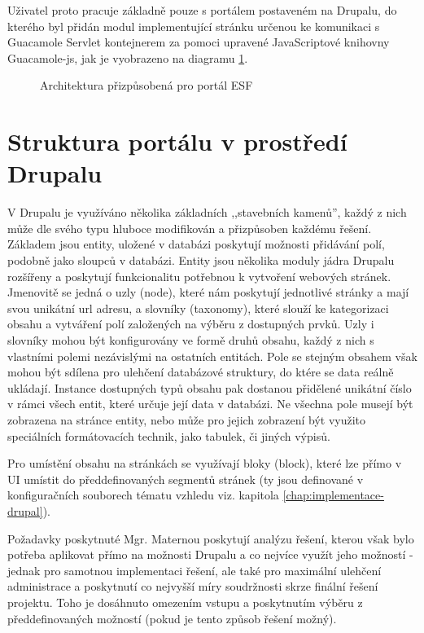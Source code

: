 Uživatel proto pracuje základně pouze s portálem postaveném na Drupalu, do kterého byl přidán modul implementující stránku určenou ke komunikaci s Guacamole Servlet kontejnerem za pomoci upravené JavaScriptové knihovny Guacamole-js, jak je vyobrazeno na diagramu \ref{fig:arch_drupal}.

\begin{figure}[htp] 
  \caption{Architektura přizpůsobená pro portál ESF}
  \label{fig:arch_drupal}
\end{figure}  

\section{Struktura portálu v prostředí Drupalu}

V Drupalu je využíváno několika základních ,,stavebních kamenů'', každý z nich může dle svého typu hluboce modifikován a přizpůsoben každému řešení. Základem jsou entity, uložené v databázi poskytují možnosti přidávání polí, podobně jako sloupců v databázi. Entity jsou několika moduly jádra Drupalu rozšířeny a poskytují funkcionalitu potřebnou k vytvoření webových stránek. Jmenovitě se jedná o uzly (node), které nám poskytují jednotlivé stránky a mají svou unikátní url adresu, a slovníky (taxonomy), které slouží ke kategorizaci obsahu a vytváření polí založených na výběru z dostupných prvků. Uzly i slovníky mohou být konfigurovány ve formě druhů obsahu, každý z nich s vlastními polemi nezávislými na ostatních entitách. Pole se stejným obsahem však mohou být sdílena pro ulehčení databázové struktury, do ktére se data reálně ukládají. Instance dostupných typů obsahu pak dostanou přidělené unikátní číslo v rámci všech entit, které určuje její data v databázi. Ne všechna pole musejí být zobrazena na stránce entity, nebo může pro jejich zobrazení být využito speciálních formátovacích technik, jako tabulek, či jiných výpisů.

Pro umístění obsahu na stránkách se využívají bloky (block), které lze přímo v UI umístit do předdefinovaných segmentů stránek (ty jsou definované v konfiguračních souborech tématu vzhledu viz. kapitola \ref{chap:implementace-drupal}).

Požadavky \cite{omaterna2013} poskytnuté Mgr. Maternou poskytují analýzu řešení, kterou však bylo potřeba aplikovat přímo na možnosti Drupalu a co nejvíce využít jeho možností - jednak pro samotnou implementaci řešení, ale také pro maximální ulehčení administrace a poskytnutí co nejvyšší míry soudržnosti skrze finální řešení projektu. Toho je dosáhnuto omezením vstupu a poskytnutím výběru z předdefinovaných možností (pokud je tento způsob řešení možný).

